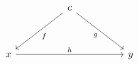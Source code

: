 \[\begin{tikzcd}
	&& c \\
	\\
	x &&&& y
	\arrow["f", from=1-3, to=3-1]
	\arrow["g"', from=1-3, to=3-5]
	\arrow["h", from=3-1, to=3-5]
\end{tikzcd}\]
